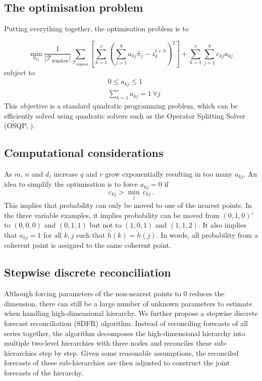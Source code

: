 \documentclass[a4paper,review,12pt,authoryear]{elsarticle}
\begin{document}
      \subsection{The optimisation problem}
      \label{sec:optimisation}
      
      Putting everything together, the optimisation problem is to 
      
      \[
      \underset{a_{kj}}{\min} \frac{1}{|\mathcal{T}_{\textrm{window}}|}\sum\limits_{\mathcal{T}_{\textrm{window}}}\left[\sum\limits_{k=1}^r\left(\sum\limits_{j=1}^q a_{kj}\hat{{\pi}}_j-z^{t+h}_k\right)^2\right] + \sum\limits_{k=1}^r\sum\limits_{j=1}^q c_{kj}a_{kj}\,
      \]
      subject to
      \begin{align*}
      &0\leq a_{kj}\leq 1\\
      &\sum\limits_{k=1}^r a_{kj} = 1 \,\forall j
      \end{align*}
      This objective is a standard quadratic programming problem, which can be efficiently solved using quadratic solvers such as the Operator Splitting Solver (OSQP, \citealp{stellatoOSQPOperatorSplitting2020}).   
  
      
      \subsection{Computational considerations}
      
      As $m$, $n$ and $d_i$ increase $q$ and $r$ grow exponentially resulting in too many $a_{kj}$. An idea to simplify the optimisation is to force $a_{kj}=0$ if 
      \[
       c_{kj}>\underset{j}{\min}\,c_{kj}\,.
      \]  
      This implies that probability can only be moved to one of the nearest points. In the three variable examples, it implies probability can be moved from $(0,1,0)'$ to $(0,0,0)$ and $(0,1,1)$ but not to $(1,0,1)$ and $(1,1,2)$. It also implies that $a_{kj}=1$ for all $k,j$ such that $\hat{h}(k)=\tilde{h}(j)$. In words, all probability from a coherent point is assigned to the same coherent point.
  
     \subsection{Stepwise discrete reconciliation}
  
     Although forcing parameters of the non-nearest points to 0 reduces the dimension, there can still be a large number of unknown parameters to estimate when handling high-dimensional hierarchy.
     We further propose a stepwise discrete forecast reconciliation (SDFR) algorithm.
     Instead of reconciling forecasts of all series together,  the algorithm
     decomposes the high-dimensional hierarchy into multiple two-level hierarchies with three nodes and reconciles these sub-hierarchies step by step.
     Given some reasonable assumptions, the reconciled forecasts of these sub-hierarchies are then adjusted to construct the joint forecasts of the hierarchy.
  
\end{document}
